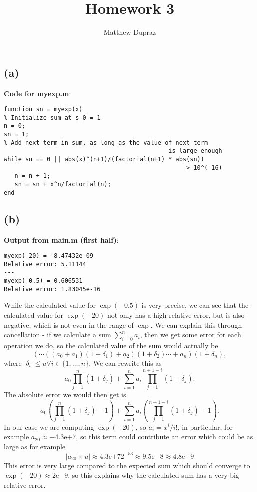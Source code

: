 \documentclass{article}
\title{Homework 3}
\author{Matthew Dupraz}
\begin{document}
\maketitle

\subsection*{(a)}

\textbf{Code for myexp.m}:
\begin{Verbatim}[frame=single]
function sn = myexp(x)
% Initialize sum at s_0 = 1
n = 0;
sn = 1;
% Add next term in sum, as long as the value of next term
                                              is large enough
while sn == 0 || abs(x)^(n+1)/(factorial(n+1) * abs(sn))
                                                   > 10^(-16)
   n = n + 1;
   sn = sn + x^n/factorial(n);
end

\end{Verbatim}
\subsection*{(b)}

\textbf{Output from main.m (first half)}:
\begin{Verbatim}[frame=single]
myexp(-20) = -8.47432e-09
Relative error: 5.11144
---
myexp(-0.5) = 0.606531
Relative error: 1.83045e-16
\end{Verbatim}

While the calculated value for $\exp(-0.5)$ is very precise,
we can see that the calculated value for $\exp(-20)$ not only has a high
relative error, but is also negative, which is not even in the range of $\exp$.
We can explain this through cancellation - if we calculate a sum
$\sum_{i=0}^n a_i$, then we get some error for each operation we do, so the
calculated value of the sum would actually be
\begin{equation}
	(\cdots((a_0 + a_1)(1 + \delta_1) + a_2)(1+\delta_2)\cdots +
	a_n)(1+\delta_n),
\end{equation}
where $|\delta_i| \leq u \forall i \in \{1, \dots, n\}$.
We can rewrite this as 
\begin{equation}
	a_0\prod_{j=1}^{n}
	(1 + \delta_j) + \sum_{i=1}^{n}a_i\prod_{j=1}^{n + 1 - i}(1 + \delta_j).
\end{equation}
The absolute error we would then get is
\begin{equation}
	a_0\left(\prod_{j=1}^{n}
	(1 + \delta_j) - 1\right) + \sum_{i=1}^{n}a_i\left(\prod_{j=1}^{n + 1 - i}
	(1 + \delta_j) - 1\right).
\end{equation}
In our case we are computing $\exp(-20)$, so $a_i = x^i/i!$, in particular, for
example $a_{20} \approx -4.3\mathrm{e}{+7}$,
so this term could contribute an error which could be as large as for example
\begin{equation}
|a_{20}\times u| \approx 4.3\mathrm{e}{+7} 2^{-53}
\approx 9.5\mathrm{e}{-8} \approx 4.8\mathrm{e}{-9}
\end{equation}
This error is very large compared to the expected sum which should converge to
$\exp(-20) \approx 2\mathrm{e}{-9}$, so this explains why the calculated sum
has a very big relative error.
\end{document}
